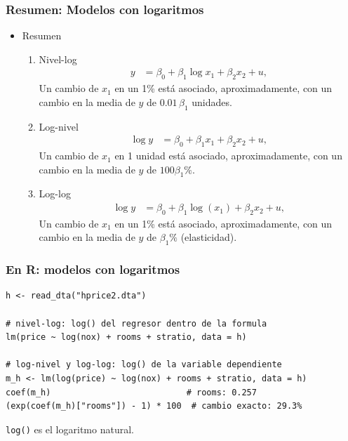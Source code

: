 \documentclass[t, compress, spanish, aspectratio=169]{beamer}
\begin{document}
    \begin{frame}[shrink=12]
        \frametitle{Resumen: Modelos con logaritmos}
        \begin{itemize}
            \item Resumen
            \begin{enumerate}
                \item Nivel-log
                \begin{align*}
                		y & =\beta_0 + \beta_1 \log x_{1} + \beta_2 x_2 + u,
                \end{align*}
                Un cambio de $x_1$ en un 1\% est\'a asociado, aproximadamente, con un cambio en la media de $y$ de $0.01\, \beta_1$ unidades.
                \item Log-nivel
                \begin{align*}
                		\log y & =\beta_0 + \beta_1 x_{1} + \beta_2 x_2 + u,
                \end{align*}
                Un cambio de $x_1$ en 1 unidad est\'a asociado, aproximadamente, con un cambio en la media de $y$ de $100 \beta_1 \%$.
                \item Log-log
                \begin{align*}
                		\log y & =\beta_0 + \beta_1 \log(x_{1}) + \beta_2 x_2 + u,
                \end{align*}
                Un cambio de $x_1$ en un 1\% est\'a asociado, aproximadamente, con un cambio en la media de $y$ de $\beta_1 \%$ (elasticidad).
            \end{enumerate}
        \end{itemize}
    \end{frame}
\begin{frame}[fragile]
	\frametitle{En R: modelos con logaritmos}
\footnotesize
\begin{verbatim}
h <- read_dta("hprice2.dta")

# nivel-log: log() del regresor dentro de la formula
lm(price ~ log(nox) + rooms + stratio, data = h)

# log-nivel y log-log: log() de la variable dependiente
m_h <- lm(log(price) ~ log(nox) + rooms + stratio, data = h)
coef(m_h)                           # rooms: 0.257
(exp(coef(m_h)["rooms"]) - 1) * 100  # cambio exacto: 29.3%
\end{verbatim}
\small
\texttt{log()} es el logaritmo natural.
\end{frame}
\end{document}

